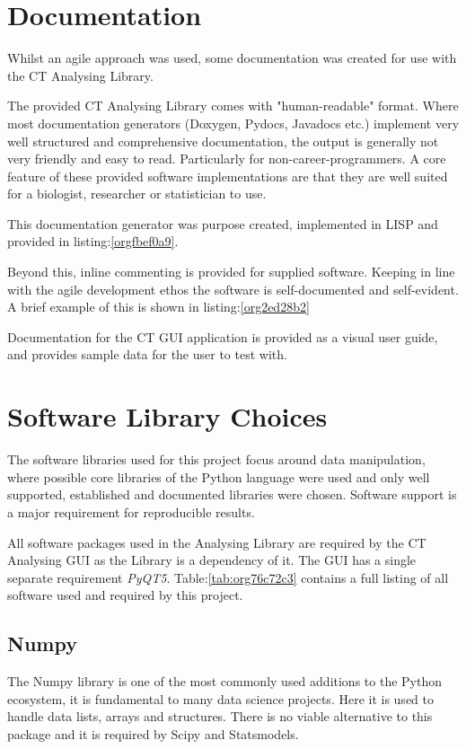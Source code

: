 \documentclass[11pt]{report}
\begin{document}
\section{Documentation}
\label{sec:org1addbed}
Whilst an agile approach was used, some documentation was created for use with the CT Analysing Library.

The provided CT Analysing Library comes with "human-readable" format. Where most documentation generators (Doxygen, Pydocs, Javadocs etc.) implement very well structured and comprehensive documentation, the output is generally not very friendly and easy to read. Particularly for non-career-programmers. A core feature of these provided software implementations are that they are well suited for a biologist, researcher or statistician to use.

This documentation generator was purpose created, implemented in LISP and provided in listing:\ref{orgfbef0a9}.

Beyond this, inline commenting is provided for supplied software. Keeping in line with the agile development ethos the software is self-documented and self-evident. A brief example of this is shown in listing:\ref{org2ed28b2}

Documentation for the CT GUI application is provided as a visual user guide, and provides sample data for the user to test with.
\section{Software Library Choices}
\label{sec:orgf78682e}
The software libraries used for this project focus around data manipulation, where possible core libraries of the Python language were used and only well supported, established and documented libraries were chosen. Software support is a major requirement for reproducible results.

All software packages used in the Analysing Library are required by the CT Analysing GUI as the Library is a dependency of it. The GUI has a single separate requirement \emph{PyQT5}.
Table:\ref{tab:org76c72c3} contains a full listing of all software used and required by this project.
\subsection{Numpy}
\label{sec:orgb3e4636}
The Numpy library is one of the most commonly used additions to the Python ecosystem, it is fundamental to many data science projects. Here it is used to handle data lists, arrays and structures. There is no viable alternative to this package and it is required by Scipy and Statsmodels.
\end{document}
